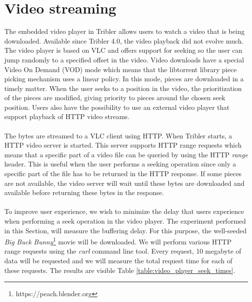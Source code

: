\section{Video streaming}
The embedded video player in Tribler allows users to watch a video that is being downloaded. Available since Tribler 4.0, the video playback did not evolve much. The video player is based on VLC and offers support for seeking so the user can jump randomly to a specified offset in the video. Video downloads have a special Video On Demand (VOD) mode which means that the libtorrent library piece picking mechanism uses a linear policy. In this mode, pieces are downloaded in a timely matter. When the user seeks to a position in the video, the prioritization of the pieces are modified, giving priority to pieces around the chosen seek position. Users also have the possibility to use an external video player that support playback of HTTP video streams.\\\\
The bytes are streamed to a VLC client using HTTP. When Tribler starts, a HTTP video server is started. This server supports HTTP range requests which means that a specific part of a video file can be queried by using the HTTP \emph{range} header. This is useful when the user performs a seeking operation since only a specific part of the file has to be returned in the HTTP response. If some pieces are not available, the video server will wait until these bytes are downloaded and available before returning these bytes in the response.\\\\
To improve user experience, we wish to minimize the delay that users experience when performing a seek operation in the video player. The experiment performed in this Section, will measure the buffering delay. For this purpose, the well-seeded \emph{Big Buck Bunny}\footnote{https://peach.blender.org} movie will be downloaded. We will perform various HTTP range requests using the \emph{curl} command line tool. Every request, 10 megabyte of data will be requested and we will measure the total request time for each of these requests. The results are visible Table \ref{table:video_player_seek_times}.\\


